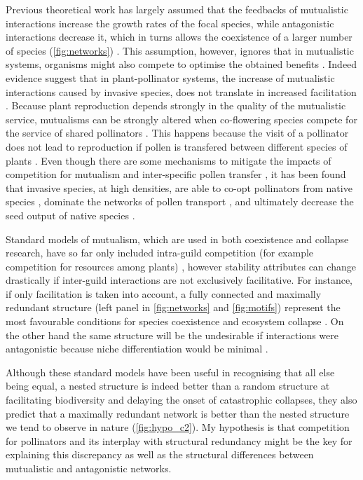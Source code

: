 \documentclass[a4paper]{article}
\begin{document}
Previous theoretical work has largely assumed that the feedbacks of mutualistic interactions increase the growth rates of the focal species, while antagonistic interactions decrease it, which in turns allows the coexistence of a larger number of species (\autoref{fig:networks}) \autocite{Moeller2004, Bastolla2009}.
This assumption, however, ignores that in mutualistic systems, organisms might also compete to optimise the obtained benefits \autocite{Levin1970}.
Indeed evidence suggest that in plant-pollinator systems, the increase of mutualistic interactions caused by invasive species, does not translate in increased facilitation \autocite{Lopezaraiza-Mikel2007}.
Because plant reproduction depends strongly in the quality of the mutualistic service, mutualisms can be strongly altered when co-flowering species compete for the service of shared pollinators \autocite{Sargent2008, Mitchell2009}.
This happens because the visit of a pollinator does not lead to reproduction if pollen is transfered between different species of plants \autocite{Morales2008}.
Even though there are some mechanisms to mitigate the impacts of competition for mutualism and inter-specific pollen transfer \autocite{Waser1979, Ghazoul2006, Bartomeus2008a}, it has been found that invasive species, at high densities, are able to co-opt pollinators from native species \autocite{Pysek2011}, dominate the networks of pollen transport \autocite{Lopezaraiza-Mikel2007, Alarcon2010}, and ultimately decrease the seed output of native species \autocite{Munoz2008}.

Standard models of mutualism, which are used in both coexistence and collapse research, have so far only included intra-guild competition (for example competition for resources among plants) \autocite{Lever2014, Bastolla2009}, however stability attributes can change drastically if inter-guild interactions are not exclusively facilitative.
For instance, if only facilitation is taken into account, a fully connected and maximally redundant structure (left panel in \autoref{fig:networks} and \ref{fig:motifs}) represent the most favourable conditions for species coexistence and ecosystem collapse \autocite{Bastolla2009, Lever2014}.
On the other hand the same structure will be the undesirable if interactions were antagonistic because niche differentiation would be minimal \autocite{Stouffer2010}.

Although these standard models have been useful in recognising that all else being equal, a nested structure is indeed better than a random structure at facilitating biodiversity and delaying the onset of catastrophic collapses, they also predict that a maximally redundant network is better than the nested structure we tend to observe in nature (\autoref{fig:hypo_c2}).
My hypothesis is that competition for pollinators and its interplay with structural redundancy might be the key for explaining this discrepancy as well as the structural differences between mutualistic and antagonistic networks.
\end{document}
